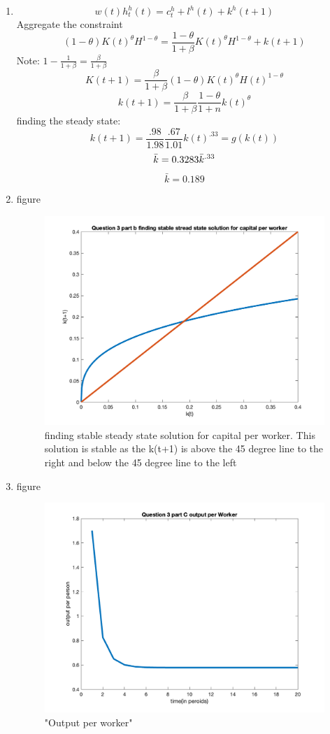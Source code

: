 \begin{enumerate}
    \item  
   $$ w(t)h^h_t(t)=c^h_t+l^h(t)+k^h(t+1)$$
   Aggregate the constraint
   $$(1-\theta)K(t)^\theta H^{1-\theta}=\frac{1-\theta}{1+\beta}K(t)^\theta H^{1-\theta}+k(t+1)$$
   Note: $1-\frac{1}{1+\beta}=\frac{\beta}{1+\beta}$
   $$K(t+1)=\frac{\beta}{1+\beta}(1-\theta)K(t)^\theta H(t)^{1-\theta}$$
   $$k(t+1)=\frac{\beta}{1+\beta}\frac{1-\theta}{1+n}k(t)^\theta$$
   finding the steady state:
    $$k(t+1)=\frac{.98}{1.98}\frac{.67}{1.01}k(t)^{.33}=g(k(t))$$
     $$\bar{k}=0.3283\Bar{k}^{.33}$$
     $$\bar{k}=0.189$$
     \item figure
     \begin{figure}[H]
        \centering
        \includegraphics[width =.75\linewidth]{HW2/pics/HW1_Q3_b.png}
        \caption{finding stable steady state solution for capital per worker. This solution is stable as the k(t+1) is above the 45 degree line to the right and below the 45 degree line to the left}
    \end{figure}
    
         \item figure
     \begin{figure}[H]
        \centering
        \includegraphics[width =.75\linewidth]{HW2/pics/HW1_Q3_c_output.png}
        \caption{"Output per worker"}
    \end{figure}


\end{enumerate}

